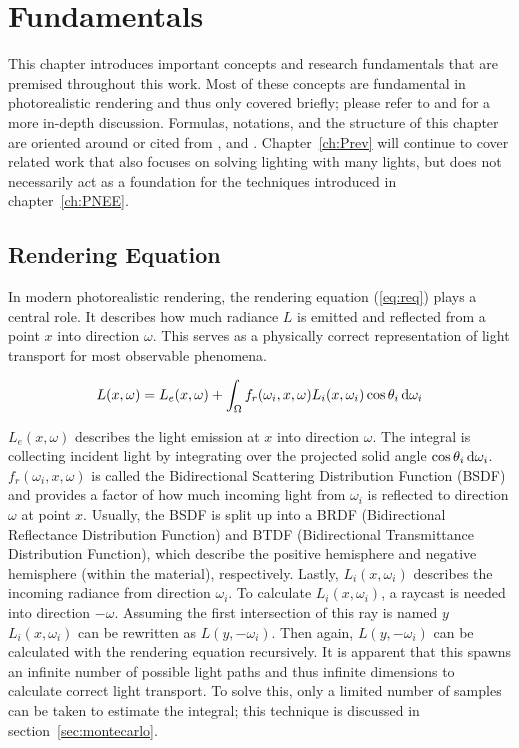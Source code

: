 \chapter{Fundamentals}
\label{ch:Fundamentals}
This chapter introduces important concepts and research fundamentals that are premised throughout this work. Most of these concepts are fundamental in photorealistic rendering and thus only covered briefly; please refer to \textcite{veach1997robust} and \textcite{DBLP:conf/siggraph/Kajiya86} for a more in-depth discussion. Formulas, notations, and the structure of this chapter are oriented around or cited from \textcite{lecture}, \textcite{lectureVis} and \textcite{pbrt}. Chapter~\ref{ch:Prev} will continue to cover related work that also focuses on solving lighting with many lights, but does not necessarily act as a foundation for the techniques introduced in chapter~\ref{ch:PNEE}.

\section{Rendering Equation}

In modern photorealistic rendering, the rendering equation (\ref{eq:req}) plays a central role. It describes how much radiance $L$ is emitted and reflected from a point $x$ into direction $\omega$. This serves as a physically correct representation of light transport for most observable phenomena.

\begin{align}
\label{eq:req}
L(x, \omega) =  L_e(x, \omega) + \int_{\Omega}f_r(\omega_i, x, \omega) L_i(x, \omega_i)\cos\theta_i \mathop{}\!\mathrm{d}\omega_i 
\end{align}

$L_e(x, \omega)$ describes the light emission at $x$ into direction $\omega$. The integral is collecting incident light by integrating over the projected solid angle $\cos\theta_i\mathop{}\!\mathrm{d}\omega_i$. $f_r(\omega_i, x, \omega)$ is called the Bidirectional Scattering Distribution Function (BSDF) and provides a factor of how much incoming light from $\omega_i$ is reflected to direction $\omega$ at point $x$. Usually, the BSDF is split up into a BRDF (Bidirectional Reflectance Distribution Function) and BTDF (Bidirectional Transmittance Distribution Function), which describe the positive hemisphere and negative hemisphere (within the material), respectively. Lastly, $L_i(x, \omega_i)$ describes the incoming radiance from direction $\omega_i$. To calculate $L_i(x, \omega_i)$, a raycast is needed into direction $-\omega$. Assuming the first intersection of this ray is named $y$ $L_i(x, \omega_i)$ can be rewritten as $L(y, -\omega_i)$. Then again, $L(y, -\omega_i)$ can be calculated with the rendering equation recursively. It is apparent that this spawns an infinite number of possible light paths and thus infinite dimensions to calculate correct light transport. To solve this, only a limited number of samples can be taken to estimate the integral; this technique is discussed in section~\ref{sec:montecarlo}.

